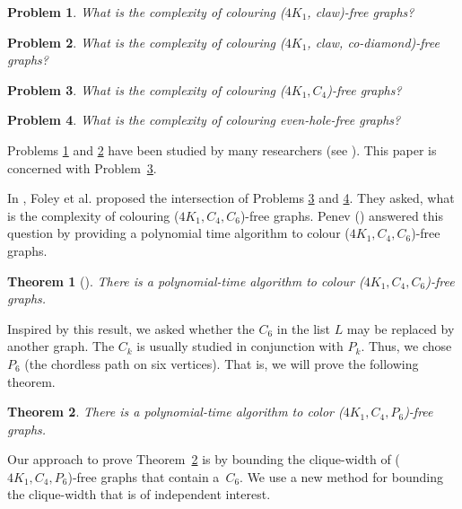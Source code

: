 \documentclass[12pt]{article}
\newtheorem{Theorem}{Theorem}[section]
\newtheorem{Problem}{Problem}[section]
\begin{document}
	\begin{Problem}\label{pro:claw}
		What is the complexity of colouring ($4K_1$, claw)-free graphs?
	\end{Problem}
	\begin{Problem}\label{pro:co-diamond}
		What is the complexity of colouring ($4K_1$, claw, co-diamond)-free graphs?
	\end{Problem}
	
	
	\begin{Problem}\label{pro:C4}
		What is the complexity of colouring ($4K_1, C_4$)-free graphs?
	\end{Problem}
	
	\begin{Problem}\label{pro:even-hole}
		What is the complexity of colouring even-hole-free graphs?
	\end{Problem}
	
	
	Problems \ref{pro:claw} and \ref{pro:co-diamond} have been studied by many researchers (see \cite{AbuHoa2022,DaiFol2022,DaiFol2022b, FraHam2018,DBLP:journals/algorithmica/PreissmannRT21}). This paper is concerned with Problem~\ref{pro:C4}. 
	
	
	In \cite{FolFra2020}, Foley et al. proposed the intersection of Problems \ref{pro:C4} and \ref{pro:even-hole}. They asked, what is the complexity of colouring ($4K_1, C_4, C_6$)-free graphs. Penev (\cite{Pen2020,Pen2022}) answered this question by providing a polynomial time algorithm to colour ($4K_1, C_4, C_6$)-free graphs. 
	
	\begin{Theorem}[\cite{Pen2020}]\label{thm:penev}
		There is a polynomial-time algorithm to colour ($4K_1, C_4, C_6$)-free graphs. 
	\end{Theorem}
	
	Inspired by this result, we asked whether the $C_6$ in the list $L$ may be replaced by another graph. The $C_k$ is usually studied in conjunction with $P_k$. Thus, we chose $P_6$ (the chordless path on six vertices). That is, we will  prove the following theorem. 
	
	\begin{Theorem}\label{thm:main}
		There is a polynomial-time algorithm to color ($4K_1, C_4, P_6$)-free graphs.
	\end{Theorem}
	
	
	Our approach to prove Theorem~\ref{thm:main} is by bounding the clique-width of ($4K_1, C_4, P_6$)-free graphs that contain a~$C_6$.  We use a new method for bounding the clique-width that is of independent interest.  
	
\end{document}
